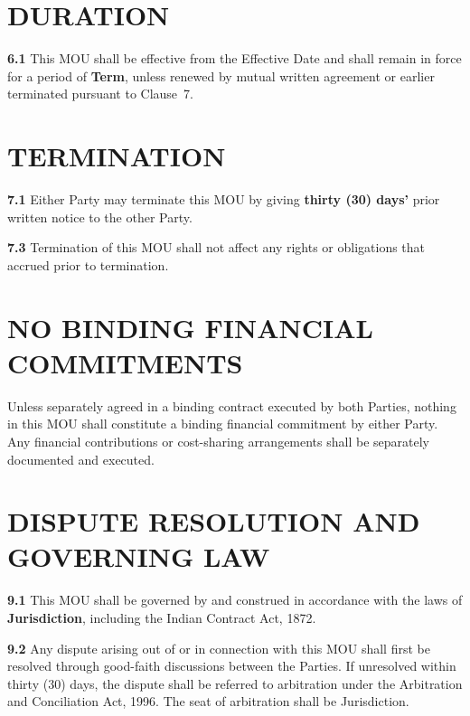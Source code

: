 \documentclass[10pt]{article}
\begin{document}
\section{DURATION}

\textbf{6.1} This MOU shall be effective from the Effective Date and shall remain in force for a period of \textbf{{{Term}}}, unless renewed by mutual written agreement or earlier terminated pursuant to Clause~7.


\section{TERMINATION}

\textbf{7.1} Either Party may terminate this MOU by giving \textbf{thirty (30) days'} prior written notice to the other Party.


\textbf{7.3} Termination of this MOU shall not affect any rights or obligations that accrued prior to termination.

\section{NO BINDING FINANCIAL COMMITMENTS}

Unless separately agreed in a binding contract executed by both Parties, nothing in this MOU shall constitute a binding financial commitment by either Party. Any financial contributions or cost-sharing arrangements shall be separately documented and executed.

\section{DISPUTE RESOLUTION AND GOVERNING LAW}

\textbf{9.1} This MOU shall be governed by and construed in accordance with the laws of \textbf{{{Jurisdiction}}}, including the Indian Contract Act, 1872.

\textbf{9.2} Any dispute arising out of or in connection with this MOU shall first be resolved through good-faith discussions between the Parties. If unresolved within thirty (30) days, the dispute shall be referred to arbitration under the Arbitration and Conciliation Act, 1996. The seat of arbitration shall be {{Jurisdiction}}.
\end{document}
